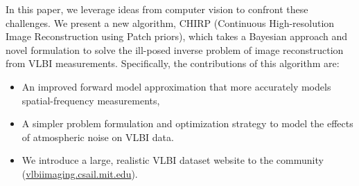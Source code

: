 In this paper, we leverage ideas from computer vision to confront these challenges. We present a new algorithm, CHIRP (Continuous High-resolution Image Reconstruction using Patch priors), which takes a Bayesian approach and novel formulation to solve the ill-posed inverse problem of image reconstruction from VLBI measurements. Specifically, the contributions of this algorithm are:

\begin{itemize}[leftmargin=*]
	\item \vspace{-.1in} An improved forward model approximation that more accurately models spatial-frequency measurements,
	\item \vspace{-.1in} A simpler problem formulation and optimization strategy to model the effects of atmospheric noise on VLBI data. %
\end{itemize}

\vspace{-.1in}
	\begin{itemize}[leftmargin=*]
	\item  \vspace{-.1in} We introduce a large, realistic VLBI dataset website to the community (\url{vlbiimaging.csail.mit.edu}).
	\end{itemize}
	\vspace{-.1in}
\noindent{This website allows researchers to easily access a large VLBI dataset, and compare their algorithms to other leading methods.
Its automatic evaluation system facilitates unbiased comparisons between algorithms, which are otherwise difficult to make and are lacking in the literature. Furthermore, we hope to make this computational imaging problem accessible to computer vision researchers, cross-fertilizing the astronomy and computer vision communities.
}






